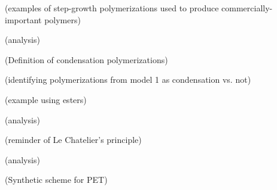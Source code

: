 \begin{activity}
\begin{instructornotes}
\end{instructornotes}


\begin{model}

	(examples of step-growth polymerizations used to produce commercially-important polymers)

\end{model}


\begin{ctqs}

	\question (analysis)
		
\end{ctqs}

\begin{infobox}

(Definition of condensation polymerizations)

\end{infobox}

\begin{ctqs}
		
		\question (identifying polymerizations from model 1 as condensation vs. not)
		
\end{ctqs}
	

\begin{model}

(example using esters)

\end{model}

\begin{ctqs}
		\question (analysis)
			
\end{ctqs}
	
\begin{infobox}

(reminder of Le Chatelier's principle)

\end{infobox}
	
\begin{ctqs}
		\question (analysis)
		
\end{ctqs}

\begin{model}

(Synthetic scheme for PET)


\end{model}
\end{activity}
